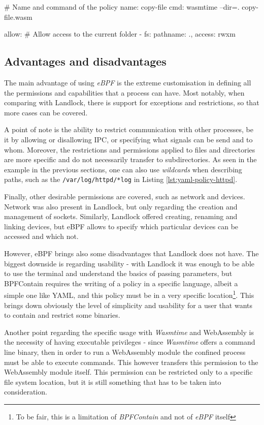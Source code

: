 \begin{code}[caption=Running WASM with BPFContain, label=lst:yaml-policy-wasm]
# Name and command of the policy
name: copy-file
cmd: wasmtime --dir=. copy-file.wasm

allow:
  # Allow access to the current folder
  - fs: {pathname: ., access: rwxm}
\end{code}

\subsection{Advantages and disadvantages}

The main advantage of using \textit{eBPF} is the extreme customisation in defining all the
permissions and capabilities that a process can have. Most notably, when comparing with Landlock,
there is support for exceptions and restrictions, so that more cases can be covered.

A point of note is the ability to restrict communication with other processes, be it by allowing
or disallowing IPC, or specifying what signals can be send and to whom.
Moreover, the restrictions and permissions applied to files and directories are more specific and do not
necessarily transfer to subdirectories. As seen in the example in the previous sections,
one can also use \textit{wildcards} when describing paths, such as the \texttt{/var/log/httpd/*log}
in Listing \ref{lst:yaml-policy-httpd}.

Finally, other desirable permissions are covered, such as network and devices. Network was also present
in Landlock, but only regarding the creation and management of sockets. Similarly, Landlock offered
creating, renaming and linking devices, but eBPF allows to specify which particular devices can be accessed
and which not.

However, eBPF brings also some disadvantages that Landlock does not have.
The biggest downside is regarding usability - with Landlock it was enough to be able to use
the terminal and understand the basics of passing parameters, but BPFContain requires the writing
of a policy in a specific language, albeit a simple one like YAML, and this policy must be in a very
specific location\footnote{To be fair, this is a limitation of \textit{BPFContain} and not of \textit{eBPF} itself}.
This brings down obviously the level of simplicity and usability for a user that wants to contain and restrict
some binaries.

Another point regarding the specific usage with \textit{Wasmtime} and WebAssembly is the necessity of
having executable privileges - since \textit{Wasmtime} offers a command line binary, then in order to run
a WebAssembly module the confined process must be able to execute commands. This however transfers this
permission to the WebAssembly module itself. This permission can be restricted only to a specific file system
location, but it is still something that has to be taken into consideration.

